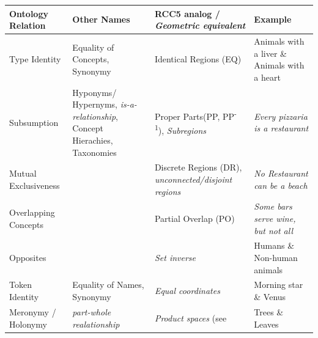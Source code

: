 \vspace{2ex}

\begin{table}[h]
\begin{tabularx}{1.05\textwidth}{P{0.16\textwidth}|P{0.25\textwidth}|P{0.25\textwidth}|X}
    Ontology Relation & Other Names        & RCC5 \cite{Cohn1997a} analog / \textit{Geometric equivalent} & Example \\ \midrule

    Type Identity     & {\scriptsize Equality of Concepts, Synonymy } & Identical Regions (EQ)      & Animals with a liver \& Animals with a heart \\ 

    Subsumption       & {\scriptsize Hyponyms/ Hypernyms, \textit{is-a-relationship}, Concept Hierachies, Taxonomies }
                                           & Proper Parts(PP, PP\textsuperscript{-1}), \textit{Subregions}
                                                                          & \textit{Every pizzaria is a restaurant} \\  
    
    Mutual 
    Exclusiveness     &                    & Discrete Regions (DR), \textit{unconnected/disjoint regions}
                                                                          & \textit{No Restaurant can be a beach} \\  

    Overlapping 
    Concepts          &                    & Partial Overlap (PO)         & \textit{Some bars serve wine, but not all} \\  

    Opposites         &                    & \textit{Set inverse}         & Humans \& Non-human animals \\ 

    Token Identity    & {\scriptsize Equality of Names, Synonymy } & \textit{Equal coordinates}   & Morning star \& Venus \\ 
    Meronymy / Holonymy & {\scriptsize \textit{part-whole realationship} }& \textit{Product spaces} (see \cite{Fiorini2013}        & Trees \& Leaves
\end{tabularx}
\label{tab:rcc_cs}
\end{table}


